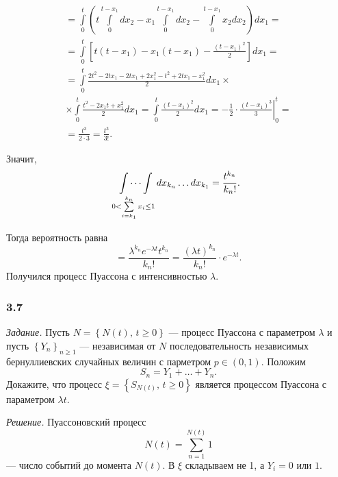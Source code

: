 \begin{enumerate}[label=\alph*)]
\begin{enumerate}
\begin{gather*}
      = \int \limits_0^t \left(
        t \int \limits_0^{t - x_1} dx_2 - x_1 \int \limits_0^{t - x_1} dx_2 -
        \int \limits_0^{t - x_1} x_2 dx_2 \right) dx_1 = \\
      = \int \limits_0^t \left[
        t \left( t - x_1 \right) - x_1 \left( t - x_1 \right) - \frac{ \left( t - x_1 \right)^2}{2}
      \right] dx_1 = \\
      = \int \limits_0^t
        \frac{2t^2 - 2tx_1 - 2tx_1 + 2x_1^2 - t^2 + 2tx_1 - x_1^2}{2} dx_1 \times \\
      \times \int \limits_0^t \frac{t^2 - 2x_1 t + x_1^2}{2} dx_1 =
      \int \limits_0^t \frac{ \left( t - x_1 \right)^2}{2} dx_1 =
      \left. -\frac{1}{2} \cdot \frac{ \left( t - x_1 \right)^3}{3} \right|_0^t = \\
      = \frac{t^3}{2 \cdot 3} =
      \frac{t^3}{3!}.
    \end{gather*}
  \end{enumerate}
  Значит,
  $$ \idotsint \limits_{0 < \sum \limits_{i = k_1}^{k_n} x_i \leq 1} dx_{k_n} \dotsc dx_{k_1} =
    \frac{t^{k_n}}{k_n!}.$$

  Тогда вероятность равна
  $$= \frac{ \lambda^{k_n} e^{-\lambda t} t^{k_n}}{k_n!} =
    \frac{ \left( \lambda t \right)^{k_n}}{k_n!} \cdot e^{-\lambda t}.$$
  Получился процесс Пуассона с интенсивностью $ \lambda $.
\end{enumerate}

\subsubsection*{3.7}

\textit{Задание.}
Пусть $N = \left\{ N \left( t \right), \, t \geq 0 \right\} $ ---
процесс Пуассона с параметром $ \lambda $ и пусть $ \left\{ Y_n \right\}_{n \geq 1}$ ---
независимая от $N$ последовательность независимых бернуллиевских случайных величин с парметром
$p \in \left( 0, 1 \right) $.
Положим
$$S_n = Y_1 + \dotsc + Y_n.$$
Докажите, что процесс $ \xi = \left\{ S_{N \left( t \right)}, \, t \geq 0 \right\} $
является процессом Пуассона с параметром $ \lambda t$.

\textit{Решение.}
Пуассоновский процесс
$$N \left( t \right) =
  \sum \limits_{n = 1}^{N \left( t \right) } 1$$
--- число событий до момента $N \left( t \right) $.
В $ \xi $ складываем не 1, а $Y_i = 0$ или $1$.

